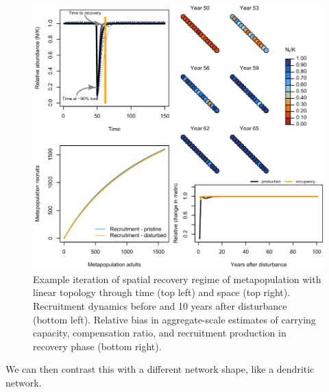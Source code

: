 \documentclass[
]{article}
\begin{document}
\begin{figure}[H]

{\centering \includegraphics{Managing_for_ecological_surprises_in_metapopulations_files/figure-latex/example results1-1} 

}

\caption{Example iteration of spatial recovery regime of metapopulation with linear topology through time (top left) and space (top right). Recruitment dynamics before and 10 years after disturbance (bottom left). Relative bias in aggregate-scale estimates of carrying capacity, compensation ratio, and recruitment production in recovery phase (bottom right).}\label{fig:example results1}
\end{figure}
\newpage

We can then contrast this with a different network shape, like a
dendritic network.
\end{document}
